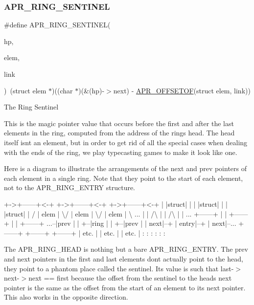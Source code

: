 \subsubsection{\texorpdfstring{A\+P\+R\+\_\+\+R\+I\+N\+G\+\_\+\+S\+E\+N\+T\+I\+N\+EL}{APR\_RING\_SENTINEL}}
{\footnotesize\ttfamily \#define A\+P\+R\+\_\+\+R\+I\+N\+G\+\_\+\+S\+E\+N\+T\+I\+N\+EL(\begin{DoxyParamCaption}\item[{}]{hp,  }\item[{}]{elem,  }\item[{}]{link }\end{DoxyParamCaption})~(struct elem $\ast$)((char $\ast$)(\&(hp)-\/$>$next) -\/ \mbox{\hyperlink{group__apr__general_gac16b1187b6ea63706c5dd48c88323dec}{A\+P\+R\+\_\+\+O\+F\+F\+S\+E\+T\+OF}}(struct elem, link))}

The Ring Sentinel

This is the magic pointer value that occurs before the first and after the last elements in the ring, computed from the address of the ring\textquotesingle{}s head. The head itself isn\textquotesingle{}t an element, but in order to get rid of all the special cases when dealing with the ends of the ring, we play typecasting games to make it look like one.

Here is a diagram to illustrate the arrangements of the next and prev pointers of each element in a single ring. Note that they point to the start of each element, not to the A\+P\+R\+\_\+\+R\+I\+N\+G\+\_\+\+E\+N\+T\+RY structure.


\begin{DoxyPre}
    +->+------+<-+  +->+------+<-+  +->+------+<-+
    |  |struct|  |  |  |struct|  |  |  |struct|  |
   /   | elem |   \textbackslash{}/   | elem |   \textbackslash{}/   | elem |  \textbackslash{}
...    |      |   /\textbackslash{}   |      |   /\textbackslash{}   |      |   ...
       +------+  |  |  +------+  |  |  +------+
  ...--|prev  |  |  +--|ring  |  |  +--|prev  |
       |  next|--+     | entry|--+     |  next|--...
       +------+        +------+        +------+
       | etc. |        | etc. |        | etc. |
       :      :        :      :        :      :
\end{DoxyPre}


The A\+P\+R\+\_\+\+R\+I\+N\+G\+\_\+\+H\+E\+AD is nothing but a bare A\+P\+R\+\_\+\+R\+I\+N\+G\+\_\+\+E\+N\+T\+RY. The prev and next pointers in the first and last elements don\textquotesingle{}t actually point to the head, they point to a phantom place called the sentinel. Its value is such that last-\/$>$next-\/$>$next == first because the offset from the sentinel to the head\textquotesingle{}s next pointer is the same as the offset from the start of an element to its next pointer. This also works in the opposite direction.


